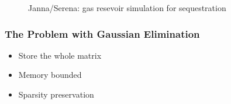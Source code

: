 \documentclass[t,12pt,numbers,fleqn]{beamer}
\begin{document}
\begin{frame}
\begin{figure}[hh]
\begin{subfigure}[b]{0.37\textwidth}
  \end{subfigure}
  \caption*{Janna/Serena: gas resevoir simulation for 
    sequestration}
  \label{fig:Serena}
\end{figure}

\end{frame}


\begin{frame}
\frametitle{The Problem with Gaussian Elimination}

\begin{itemize}
\item Store the whole matrix
\item Memory bounded
\item Sparsity preservation
\end{itemize}


\end{frame}
\end{document}
